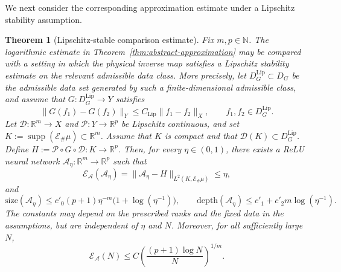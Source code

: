 \documentclass{article}
\numberwithin{equation}{section}
\theoremstyle{plain}
\newtheorem{theorem}{Theorem}[section]
\begin{document}
	We next consider the corresponding approximation estimate under a Lipschitz stability assumption.
    \begin{theorem}[Lipschitz-stable comparison estimate]
		Fix $m,p\in\mathbb N$. The logarithmic estimate in Theorem~\ref{thm:abstract-approximation} may be compared with a setting in which the physical inverse map satisfies a Lipschitz stability estimate on the relevant admissible data class. More precisely, let $D_G^{\mathrm{Lip}}\subset D_G$ be the admissible data set generated by such a finite-dimensional admissible class, and assume that $G:D_G^{\mathrm{Lip}}\to Y$ satisfies
		\begin{equation*}
			\|G(f_1)-G(f_2)\|_Y
			\le
			C_{\mathrm{Lip}}\|f_1-f_2\|_X,
			\qquad f_1,f_2\in D_G^{\mathrm{Lip}}.
		\end{equation*}
		Let $\mathcal D:\mathbb R^m\to X$ and $\mathcal P:Y\to\mathbb R^p$ be Lipschitz continuous, and set $K:=\operatorname{supp}(\mathcal E_\#\mu)\subset\mathbb R^m$. Assume that $K$ is compact and that
		$\mathcal D(K)\subset D_G^{\mathrm{Lip}}$. Define $H:=\mathcal P\circ G\circ\mathcal D:K\to\mathbb R^p$.
		Then, for every $\eta\in(0,1)$, there exists a ReLU neural network $\mathcal A_\eta:\mathbb R^m\to\mathbb R^p$ such that
		\begin{equation*}
			\mathscr E_{\mathcal A}(\mathcal A_\eta)
			=
			\|\mathcal A_\eta-H\|_{L^2(K,\mathcal E_\#\mu)}
			\le \eta,
		\end{equation*}
		and
		\begin{equation*}
			\mathrm{size}(\mathcal A_\eta)
			\le c'_0(p+1)\eta^{-m}\bigl(1+\log(\eta^{-1})\bigr),
			\qquad
			\mathrm{depth}(\mathcal A_\eta)
			\le c'_1+c'_2m\log(\eta^{-1}).
		\end{equation*}
		The constants may depend on the prescribed ranks and the fixed data in the assumptions, but are independent of $\eta$ and $N$. Moreover, for all sufficiently large $N$,
		\begin{equation*}
			\mathscr E_{\mathcal A}(N)
			\le
			C\left(\frac{(p+1)\log N}{N}\right)^{1/m}.
		\end{equation*}
	\end{theorem}
\end{document}
